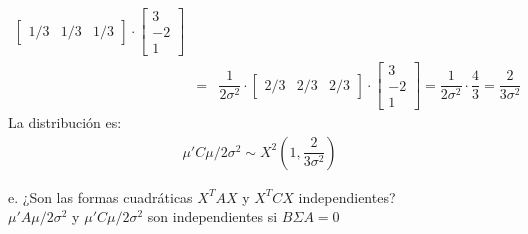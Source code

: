 \documentclass[12pt,a4paper]{report}
\begin{document}
\begin{enumerate}
\begin{eqnarray*}
\begin{bmatrix}
			1/3 & 1/3 & 1/3
		\end{bmatrix}
		\cdot
		\begin{bmatrix}
			3 \\
			-2  \\
			1 
		\end{bmatrix}\\
		&=& \dfrac{1}{2\sigma^{2}} \cdot \begin{bmatrix}
			2/3 & 2/3 & 2/3
		\end{bmatrix}	\cdot
		\begin{bmatrix}
		3 \\
		-2  \\
		1 
		\end{bmatrix} = \dfrac{1}{2\sigma^{2}} \cdot \dfrac{4}{3} = \dfrac{2}{3\sigma^{2}}
	\end{eqnarray*}
La distribución es:
	\begin{eqnarray*}
		\mu'C\mu/2\sigma^{2} \sim X^{2} \left(1,\dfrac{2}{3\sigma^{2}}\right)
	\end{eqnarray*} 
	
e. ¿Son las formas cuadráticas $X^TAX$ y $X^TCX$ independientes?\\

$\mu'A\mu/2\sigma^{2}$ y $\mu'C\mu/2\sigma^{2}$ son independientes si $B\Sigma A=0$
	

\end{enumerate}
\end{document}
